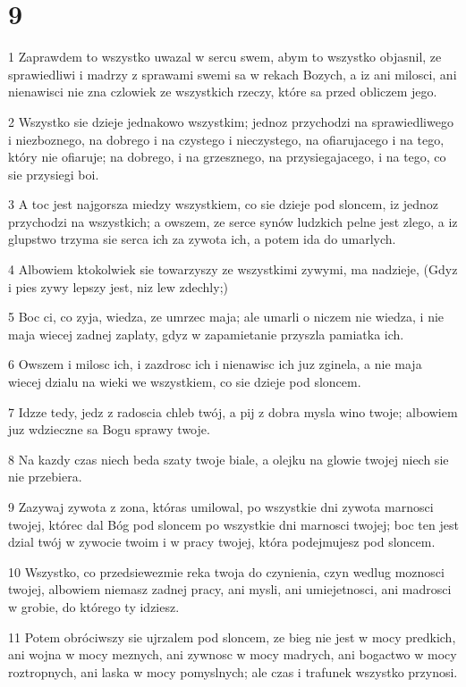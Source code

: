 \chapter{9}

\par 1 Zaprawdem to wszystko uwazal w sercu swem, abym to wszystko objasnil, ze sprawiedliwi i madrzy z sprawami swemi sa w rekach Bozych, a iz ani milosci, ani nienawisci nie zna czlowiek ze wszystkich rzeczy, które sa przed obliczem jego.
\par 2 Wszystko sie dzieje jednakowo wszystkim; jednoz przychodzi na sprawiedliwego i niezboznego, na dobrego i na czystego i nieczystego, na ofiarujacego i na tego, który nie ofiaruje; na dobrego, i na grzesznego, na przysiegajacego, i na tego, co sie przysiegi boi.
\par 3 A toc jest najgorsza miedzy wszystkiem, co sie dzieje pod sloncem, iz jednoz przychodzi na wszystkich; a owszem, ze serce synów ludzkich pelne jest zlego, a iz glupstwo trzyma sie serca ich za zywota ich, a potem ida do umarlych.
\par 4 Albowiem ktokolwiek sie towarzyszy ze wszystkimi zywymi, ma nadzieje, (Gdyz i pies zywy lepszy jest, niz lew zdechly;)
\par 5 Boc ci, co zyja, wiedza, ze umrzec maja; ale umarli o niczem nie wiedza, i nie maja wiecej zadnej zaplaty, gdyz w zapamietanie przyszla pamiatka ich.
\par 6 Owszem i milosc ich, i zazdrosc ich i nienawisc ich juz zginela, a nie maja wiecej dzialu na wieki we wszystkiem, co sie dzieje pod sloncem.
\par 7 Idzze tedy, jedz z radoscia chleb twój, a pij z dobra mysla wino twoje; albowiem juz wdzieczne sa Bogu sprawy twoje.
\par 8 Na kazdy czas niech beda szaty twoje biale, a olejku na glowie twojej niech sie nie przebiera.
\par 9 Zazywaj zywota z zona, któras umilowal, po wszystkie dni zywota marnosci twojej, którec dal Bóg pod sloncem po wszystkie dni marnosci twojej; boc ten jest dzial twój w zywocie twoim i w pracy twojej, która podejmujesz pod sloncem.
\par 10 Wszystko, co przedsiewezmie reka twoja do czynienia, czyn wedlug moznosci twojej, albowiem niemasz zadnej pracy, ani mysli, ani umiejetnosci, ani madrosci w grobie, do którego ty idziesz.
\par 11 Potem obróciwszy sie ujrzalem pod sloncem, ze bieg nie jest w mocy predkich, ani wojna w mocy meznych, ani zywnosc w mocy madrych, ani bogactwo w mocy roztropnych, ani laska w mocy pomyslnych; ale czas i trafunek wszystko przynosi.
